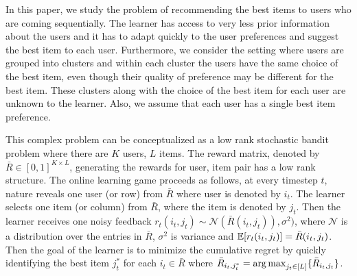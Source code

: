 In this paper, we study the problem of recommending the best items to users who are coming sequentially. The learner has access to very less prior information about the users and it has to adapt quickly to the user preferences and suggest the best item to each user. Furthermore, we consider the setting where users are grouped into clusters and within each cluster the users have the same choice of the best item, even though their quality of preference may be different for the best item. These clusters along with the choice of the best item for each user are unknown to the learner.  Also, we assume that each user has a single best item preference.

	This complex problem can be conceptualized as a low rank stochastic bandit problem where there are $K$ users, $L$ items. The reward matrix, denoted by $\bar{R}\in [0,1]^{K\times L}$,  generating the rewards for user, item pair has a low rank structure. The online learning game proceeds as follows, at every timestep $t$,  nature reveals one user (or row) from $\bar{R}$ where user is denoted by $i_t$. The learner selects one item (or column) from $\bar{R}$, where the item is denoted by $j_t$. Then the learner receives one noisy feedback $r_{t}(i_t,j_t)\sim\mathcal{N}(\bar{R}(i_t,j_t)),\sigma^2)$, where $\mathcal{N}$ is a distribution over the entries in $\bar{R}$, $\sigma^2$ is variance and $\mathbb{E}[r_{t}(i_t,j_t)] = \bar{R}(i_t,j_t)$. Then the goal of the learner is to minimize the cumulative regret by quickly identifying the best item $j^*_t$ for each $i_t\in \bar{R}$ where $\bar{R}_{i_t,j^*_t} = \mathop{\rm arg\,max} _{j_t\in[L]}\lbrace \bar{R}_{i_t,j_t} \rbrace$. %